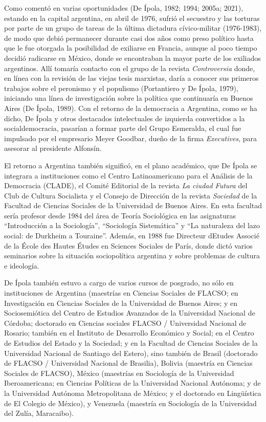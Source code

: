 Como comentó en varias oportunidades (De Ípola, 1982; 1994; 2005a; 2021), estando en la capital argentina, en abril de 1976, sufrió el secuestro y las torturas por parte de un grupo de tareas de la última dictadura cívico-militar (1976-1983), de modo que debió permanecer durante casi dos años como preso político hasta que le fue otorgada la posibilidad de exiliarse en Francia, aunque al poco tiempo decidió radicarse en México, donde se encontraban la mayor parte de los exiliados argentinos. Allí tomaría contacto con el grupo de la revista \emph{Controversia} donde, en línea con la revisión de las viejas tesis marxistas, daría a conocer sus primeros trabajos sobre el peronismo y el populismo (Portantiero y De Ípola, 1979), iniciando una línea de investigación sobre la política que continuaría en Buenos Aires (De Ípola, 1989). Con el retorno de la democracia a Argentina, como se ha dicho, De Ípola y otros destacados intelectuales de izquierda convertidos a la socialdemocracia, pasarían a formar parte del Grupo Esmeralda, el cual fue impulsado por el empresario Meyer Goodbar, dueño de la firma \emph{Executives}, para asesorar al presidente Alfonsín.

El retorno a Argentina también significó, en el plano académico, que De Ípola se integrara a instituciones como el Centro Latinoamericano para el Análisis de la Democracia (CLADE), el Comité Editorial de la revista \emph{La ciudad Futura} del Club de Cultura Socialista y el Consejo de Dirección de la revista \emph{Sociedad} de la Facultad de Ciencias Sociales de la Universidad de Buenos Aires. En esta facultad sería profesor desde 1984 del área de Teoría Sociológica en las asignaturas ``Introducción a la Sociología'', ``Sociología Sistemática'' y ``La naturaleza del lazo social: de Durkheim a Touraine''. Además, en 1988 fue Directeur d\textquotesingle Etudes Associé de la École des Hautes Études en Sciences Sociales de París, donde dictó varios seminarios sobre la situación sociopolítica argentina y sobre problemas de cultura e ideología.

De Ípola también estuvo a cargo de varios cursos de posgrado, no sólo en instituciones de Argentina (maestrías en Ciencias Sociales de FLACSO; en Investigación en Ciencias Sociales de la Universidad de Buenos Aires; y en Sociosemiótica del Centro de Estudios Avanzados de la Universidad Nacional de Córdoba; doctorado en Ciencias sociales FLACSO / Universidad Nacional de Rosario; también en el Instituto de Desarrollo Económico y Social; en el Centro de Estudios del Estado y la Sociedad; y en la Facultad de Ciencias Sociales de la Universidad Nacional de Santiago del Estero), sino también de Brasil (doctorado de FLACSO / Universidad Nacional de Brasilia), Bolivia (maestría en Ciencias Sociales de FLACSO), México (maestrías en Sociología de la Universidad Iberoamericana; en Ciencias Políticas de la Universidad Nacional Autónoma; y de la Universidad Autónoma Metropolitana de México; y el doctorado en Lingüística de El Colegio de México), y Venezuela (maestría en Sociología de la Universidad del Zulía, Maracaibo).

